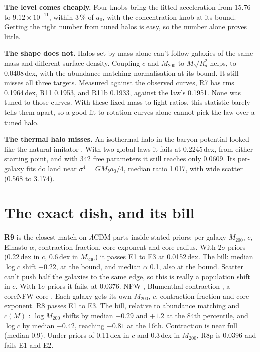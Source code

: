 \documentclass[11pt]{article}
\begin{document}
\textbf{The level comes cheaply.} Four knobs bring the fitted acceleration from $15.76$ to $9.12\times10^{-11}$, within 3\,\% of $a_0$, with the concentration knob at its bound. Getting the right number from tuned halos is easy, so the number alone proves little.

\textbf{The shape does not.} Halos set by mass alone can't follow galaxies of the same mass and different surface density. Coupling $c$ and $M_{200}$ to $M_b/R_d^2$ helps, to 0.0408\,dex, with the abundance-matching normalisation at its bound. It still misses all three targets. Measured against the observed curves, R7 has rms 0.1964\,dex, R11 0.1953, and R11b 0.1933, against the law's 0.1951. None was tuned to those curves. With these fixed mass-to-light ratios, this statistic barely tells them apart, so a good fit to rotation curves alone cannot pick the law over a tuned halo.

\textbf{The thermal halo misses.} An isothermal halo in the baryon potential looked like the natural imitator \cite{kaplinghat16}. With two global laws it fails at 0.2245\,dex, from either starting point, and with 342 free parameters it still reaches only 0.0609. Its per-galaxy fits do land near $\sigma^4=GM_ba_0/4$, median ratio 1.017, with wide scatter (0.568 to 3.174).

\section{The exact dish, and its bill}
\textbf{R9} is the closest match on $\Lambda$CDM parts inside stated priors: per galaxy $M_{200}$, $c$, Einasto $\alpha$, contraction fraction, core exponent and core radius. With 2$\sigma$ priors (0.22\,dex in $c$, 0.6\,dex in $M_{200}$) it passes E1 to E3 at 0.0152\,dex. The bill: median $\log c$ shift $-0.22$, at the bound, and median $\alpha$ 0.1, also at the bound. Scatter can't push half the galaxies to the same edge, so this is really a population shift in $c$. With 1$\sigma$ priors it fails, at 0.0376. NFW \cite{nfw}, Blumenthal contraction \cite{blumenthal86}, a coreNFW core \cite{read16}. Each galaxy gets its own $M_{200}$, $c$, contraction fraction and core exponent. R8 passes E1 to E3. The bill, relative to abundance matching \cite{moster13} and $c(M)$ \cite{diemer19}: $\log M_{200}$ shifts by median $+0.29$ and $+1.2$ at the 84th percentile, and $\log c$ by median $-0.42$, reaching $-0.81$ at the 16th. Contraction is near full (median 0.9). Under priors of 0.11\,dex in $c$ and 0.3\,dex in $M_{200}$, R8p is 0.0396 and fails E1 and E2.
\end{document}
